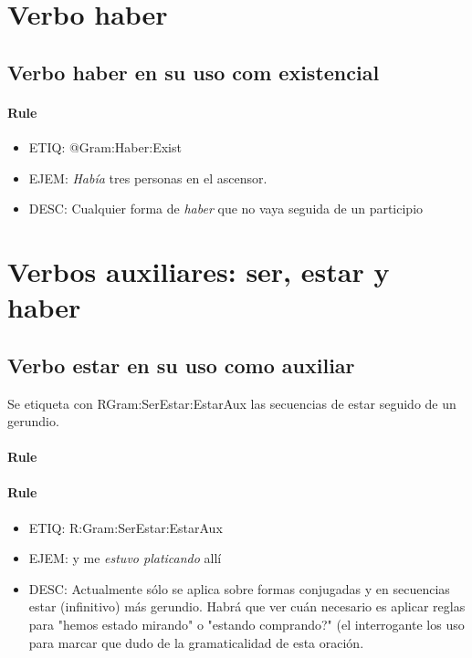 \documentclass[11pt]{report}
\begin{document}
\section{Verbo haber}
\subsection{Verbo haber en su uso com existencial}
\paragraph*{Rule}
\begin{itemize}
\item ETIQ: @Gram:Haber:Exist
\item EJEM: \emph{Había} tres personas en el ascensor. 
\item DESC: Cualquier forma de \emph{haber} que no vaya seguida de un participio
\end{itemize}

\section{Verbos auxiliares: ser, estar y haber}
\subsection{Verbo estar en su uso como auxiliar}
Se etiqueta con RGram:SerEstar:EstarAux las secuencias de estar seguido de un gerundio.

\paragraph*{Rule}
\paragraph*{Rule}
\begin{itemize}
\item ETIQ: R:Gram:SerEstar:EstarAux
\item EJEM: y me \emph{estuvo platicando} allí
\item DESC: Actualmente sólo se aplica sobre formas conjugadas y en secuencias estar (infinitivo) más gerundio. Habrá que ver cuán necesario es aplicar reglas para "hemos estado mirando" o "estando comprando?" (el interrogante los uso para marcar que dudo de la gramaticalidad de esta oración.
\end{itemize}
\end{document}
